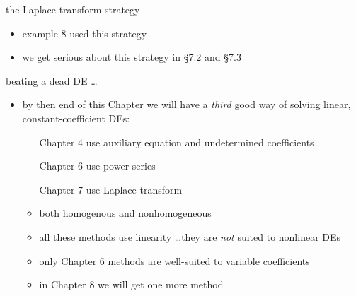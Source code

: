 \documentclass[urlcolor=blue,dvipsnames]{beamer}
\begin{document}
\begin{frame}{the Laplace transform strategy}

\begin{center}
\end{center}

\begin{itemize}
\item example 8 used this strategy
\item we get serious about this strategy in \S 7.2 and \S 7.3
\end{itemize}
\end{frame}


\begin{frame}{beating a dead DE \dots}

\begin{itemize}
\item by then end of this Chapter we will have a \emph{third} good way of solving linear, constant-coefficient DEs:
     \begin{itemize}
     \item[Chapter 4] use auxiliary equation and undetermined coefficients
     \item[Chapter 6] use power series
     \item[Chapter 7] use Laplace transform

\bigskip
     \item both homogenous and nonhomogeneous
     \item all these methods use linearity \dots they are \emph{not} suited to nonlinear DEs
     \item only Chapter 6 methods are well-suited to variable coefficients
     \item in Chapter 8 we will get one more method
     \end{itemize}
\end{itemize}
\end{frame}
\end{document}

